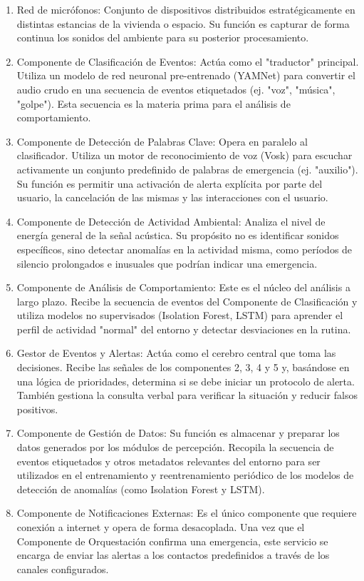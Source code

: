 \begin{enumerate}
  \item Red de micrófonos: Conjunto de dispositivos distribuidos estratégicamente en distintas estancias de la vivienda o espacio. Su función es capturar de forma continua los sonidos del ambiente para su posterior procesamiento.
  \item Componente de Clasificación de Eventos: Actúa como el "traductor" principal. Utiliza un modelo de red neuronal pre-entrenado (YAMNet) para convertir el audio crudo en una secuencia de eventos etiquetados (ej. "voz", "música", "golpe"). Esta secuencia es la materia prima para el análisis de comportamiento.
  \item Componente de Detección de Palabras Clave: Opera en paralelo al clasificador. Utiliza un motor de reconocimiento de voz (Vosk) para escuchar activamente un conjunto predefinido de palabras de emergencia (ej. "auxilio"). Su función es permitir una activación de alerta explícita por parte del usuario, la cancelación de las mismas y las interacciones con el usuario.
  \item Componente de Detección de Actividad Ambiental: Analiza el nivel de energía general de la señal acústica. Su propósito no es identificar sonidos específicos, sino detectar anomalías en la actividad misma, como períodos de silencio prolongados e inusuales que podrían indicar una emergencia.
  \item Componente de Análisis de Comportamiento: Este es el núcleo del análisis a largo plazo. Recibe la secuencia de eventos del Componente de Clasificación y utiliza modelos no supervisados (Isolation Forest, LSTM) para aprender el perfil de actividad "normal" del entorno y detectar desviaciones en la rutina.
  \item Gestor de Eventos y Alertas: Actúa como el cerebro central que toma las decisiones. Recibe las señales de los componentes 2, 3, 4 y 5 y, basándose en una lógica de prioridades, determina si se debe iniciar un protocolo de alerta. También gestiona la consulta verbal para verificar la situación y reducir falsos positivos.
  \item Componente de Gestión de Datos: Su función es almacenar y preparar los datos generados por los módulos de percepción. Recopila la secuencia de eventos etiquetados y otros metadatos relevantes del entorno para ser utilizados en el entrenamiento y reentrenamiento periódico de los modelos de detección de anomalías (como Isolation Forest y LSTM).
  \item Componente de Notificaciones Externas: Es el único componente que requiere conexión a internet y opera de forma desacoplada. Una vez que el Componente de Orquestación confirma una emergencia, este servicio se encarga de enviar las alertas a los contactos predefinidos a través de los canales configurados.
\end{enumerate}

